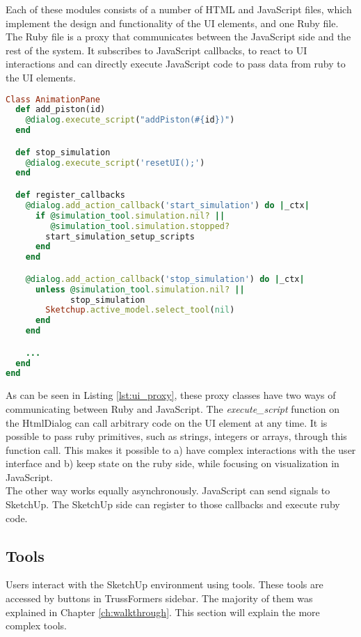 Each of these modules consists of a number of HTML and JavaScript files, which implement the design and functionality of the UI elements, and one Ruby file. The Ruby file is a proxy that communicates between the JavaScript side and the rest of the system. It subscribes to JavaScript callbacks, to react to UI interactions and can directly execute JavaScript code to pass data from ruby to the UI elements.
\begin{lstlisting}[language=Ruby, label={lst:ui_proxy}, caption=excerpt from UI callbacks]
Class AnimationPane
  def add_piston(id)
    @dialog.execute_script("addPiston(#{id})")
  end

  def stop_simulation
    @dialog.execute_script('resetUI();')
  end

  def register_callbacks
    @dialog.add_action_callback('start_simulation') do |_ctx|
      if @simulation_tool.simulation.nil? ||
         @simulation_tool.simulation.stopped?
        start_simulation_setup_scripts
      end
    end

    @dialog.add_action_callback('stop_simulation') do |_ctx|
      unless @simulation_tool.simulation.nil? ||
             stop_simulation
        Sketchup.active_model.select_tool(nil)
      end
    end

    ...
  end
end
\end{lstlisting}
As can be seen in Listing \ref{lst:ui_proxy}, these proxy classes have two ways of communicating between Ruby and JavaScript. The \textit{execute\_script} function on the HtmlDialog can call arbitrary code on the UI element at any time. It is possible to pass ruby primitives, such as strings, integers or arrays, through this function call. This makes it possible to a) have complex interactions with the user interface and b) keep state on the ruby side, while focusing on visualization in JavaScript.\\
The other way works equally asynchronously. JavaScript can send signals to SketchUp. The SketchUp side can register to those callbacks and execute ruby code.

\subsection{Tools}
Users interact with the SketchUp environment using tools. These tools are accessed by buttons in TrussFormers sidebar. The majority of them was explained in Chapter \ref{ch:walkthrough}. This section will explain the more complex tools.

